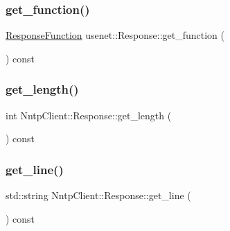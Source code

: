 \hypertarget{class_nntp_client_1_1_response_afc9e17cf40b937764e64d54a88a72bfe}{}\label{class_nntp_client_1_1_response_afc9e17cf40b937764e64d54a88a72bfe} 
\subsubsection{\texorpdfstring{get\+\_\+function()}{get\_function()}}
{\footnotesize\ttfamily \hyperlink{namespace_nntp_client_a2c87b9cd86975a1986a221b9a5885fb8}{Response\+Function} usenet\+::\+Response\+::get\+\_\+function (\begin{DoxyParamCaption}{ }\end{DoxyParamCaption}) const}

\hypertarget{class_nntp_client_1_1_response_af9da91909f7e838347dacf4a64f92be9}{}\label{class_nntp_client_1_1_response_af9da91909f7e838347dacf4a64f92be9} 
\subsubsection{\texorpdfstring{get\+\_\+length()}{get\_length()}}
{\footnotesize\ttfamily int Nntp\+Client\+::\+Response\+::get\+\_\+length (\begin{DoxyParamCaption}{ }\end{DoxyParamCaption}) const\hspace{0.3cm}{\ttfamily [inline]}}

\hypertarget{class_nntp_client_1_1_response_a3c184598a661e2509418aae0438588c1}{}\label{class_nntp_client_1_1_response_a3c184598a661e2509418aae0438588c1} 
\subsubsection{\texorpdfstring{get\+\_\+line()}{get\_line()}}
{\footnotesize\ttfamily std\+::string Nntp\+Client\+::\+Response\+::get\+\_\+line (\begin{DoxyParamCaption}{ }\end{DoxyParamCaption}) const\hspace{0.3cm}{\ttfamily [inline]}}

